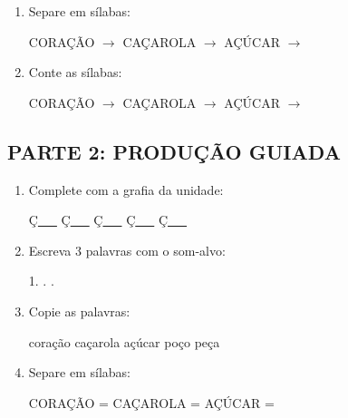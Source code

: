 \begin{exercicio}
\begin{enumerate}
  \item Separe em sílabas:
  \begin{center}
  CORAÇÃO $\rightarrow$ \underline{\hspace{1cm}} \quad CAÇAROLA $\rightarrow$ \underline{\hspace{1cm}} \quad AÇÚCAR $\rightarrow$ \underline{\hspace{1cm}}
  \end{center}

  \item Conte as sílabas:
  \begin{center}
  CORAÇÃO $\rightarrow$ \underline{\hspace{0.9cm}} \quad CAÇAROLA $\rightarrow$ \underline{\hspace{0.9cm}} \quad AÇÚCAR $\rightarrow$ \underline{\hspace{0.9cm}}
  \end{center}

\end{enumerate}

\subsection*{PARTE 2: PRODUÇÃO GUIADA}

\begin{enumerate}[resume]

  \item Complete com a grafia da unidade:
  \begin{center}
  Ç\underline{~~~} \quad Ç\underline{~~~} \quad Ç\underline{~~~} \quad Ç\underline{~~~} \quad Ç\underline{~~~}
  \end{center}

  \item Escreva 3 palavras com o som-alvo:
  \begin{center}
  1. \underline{\hspace{3cm}} . \underline{\hspace{3cm}} . \underline{\hspace{3cm}}
  \end{center}

  \item Copie as palavras:
  \begin{center}
  coração \quad caçarola \quad açúcar \quad poço \quad peça
  \end{center}

  \item Separe em sílabas:
  \begin{center}
  CORAÇÃO = \underline{\hspace{1cm}} \underline{\hspace{1cm}} \quad CAÇAROLA = \underline{\hspace{1cm}} \underline{\hspace{1cm}} \quad AÇÚCAR = \underline{\hspace{1cm}} \underline{\hspace{1cm}}
  \end{center}


\end{enumerate}
\end{exercicio}
